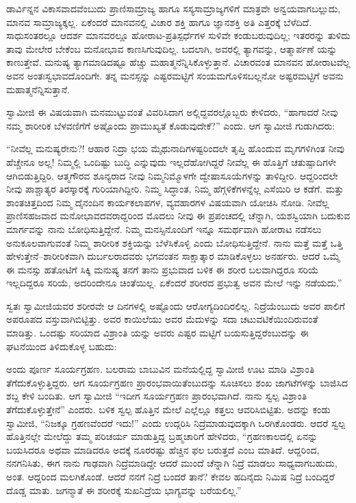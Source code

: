 ಡಾರ್ವಿನ್ನನ ವಿಕಾಸವಾದವೆಂಬುದು ಪ್ರಾಣಿಸಾಮ್ರಾಜ್ಯ ಹಾಗೂ ಸಸ್ಯಸಾಮ್ರಾಜ್ಯಗಳಿಗೆ ಮಾತ್ರವೇ ಅನ್ವಯವಾಗಬಲ್ಲುದು, ಮಾನವ ಸಾಮ್ರಾಜ್ಯಕ್ಕಲ್ಲ. ಏಕೆಂದರೆ ಮಾನವನಲ್ಲಿ ವಿಚಾರ ಶಕ್ತಿ ಹಾಗೂ ಜ್ಞಾನಶಕ್ತಿ ಅತಿ ಎತ್ತರಕ್ಕೆ ಬೆಳೆದಿದೆ. ಸಾಧುಸಂತರಲ್ಲೂ ಆದರ್ಶ ಮಾನವರಲ್ಲೂ ಹೋರಾಟ-ಪ್ರತಿಸ್ಪರ್ಧೆಗಳ ಸುಳಿವೇ ಕಂಡುಬರುವುದಿಲ್ಲ; ಇತರರನ್ನು ತುಳಿದು ತಾವು ಮೇಲೇರ ಬೇಕೆಂಬ ಮನೋಭಾವ ಕಾಣಸಿಗುವುದಿಲ್ಲ. ಬದಲಾಗಿ, ಅವರಲ್ಲಿ ತ್ಯಾಗವನ್ನು, ಆತ್ಮಾರ್ಪಣೆ ಯನ್ನು ಕಾಣುತ್ತೇವೆ. ಮನುಷ್ಯ ತ್ಯಾಗಮಾಡಿದಷ್ಟೂ ಹೆಚ್ಚು ಮಹಾತ್ಮನೆನ್ನಿಸಿಕೊಳ್ಳುತ್ತಾನೆ. ವಿಚಾರವಂತ ಮಾನವನ ಹೋರಾಟವೆಲ್ಲ ಅವನ ಅಂತಃಸ್ವಭಾವದೊಂದಿಗೇ. ತನ್ನ ಮನಸ್ಸನ್ನು ಎಷ್ಟರಮಟ್ಟಿಗೆ ಸಂಯಮಗೊಳಿಸಬಲ್ಲನೋ ಅಷ್ಟರಮಟ್ಟಿಗೆ ಅವನು ಮಹಾತ್ಮನೆನ್ನಿಸುತ್ತಾನೆ.

ಸ್ವಾಮೀಜಿ ಈ ವಿಷಯವಾಗಿ ಮನಮುಟ್ಟುವಂತೆ ವಿವರಿಸಿದಾಗ ಅಲ್ಲಿದ್ದವರಲ್ಲೊಬ್ಬರು ಕೇಳಿದರು, “ಹಾಗಾದರೆ ನೀವು ನಮ್ಮ ಶಾರೀರಿಕ ಬೆಳವಣಿಗೆಗೆ ಅಷ್ಟೊಂದು ಪ್ರಾಮುಖ್ಯತೆ ಕೊಡುವುದೇಕೆ?” ಎಂದು. ಆಗ ಸ್ವಾಮೀಜಿ ಗುಡುಗಿದರು:

“ನೀವೆಲ್ಲ ಮನುಷ್ಯರೇನು?! ಆಹಾರ ನಿದ್ರಾ ಭಯ ಮೈಥುನಾದಿಗಳಷ್ಟರಿಂದಲೇ ತೃಪ್ತಿ ಹೊಂದುವ ಮೃಗಗಳಿಗಿಂತ ನೀವು ಹೆಚ್ಚೇನೂ ಅಲ್ಲ! ನಿಮ್ಮಲ್ಲಿ ಒಂದಿಷ್ಟು ಬುದ್ಧಿ ಎನ್ನುವುದು ಇಲ್ಲದೆಹೋಗಿದ್ದರೆ ನೀವೆಲ್ಲ ಈ ಹೊತ್ತಿಗೆ ಚತುಷ್ಪಾದಿಗಳೇ ಆಗಿಬಿಡುತ್ತಿದ್ದಿರಿ. ಆತ್ಮಗೌರವ ಶೂನ್ಯರಾದ ನೀವು ನಿಮ್ಮನಿಮ್ಮೊಳಗೇ ದ್ವೇಷಾಸೂಯೆಗಳನ್ನು ತಾಳಿದ್ದೀರಿ. ಆದ್ದರಿಂದಲೇ ನೀವು ಪಾಶ್ಚಾತ್ಯರ ತಿರಸ್ಕಾರಕ್ಕೆ ಗುರಿಯಾಗಿದ್ದೀರಿ. ನಿಮ್ಮ ಸಿದ್ಧಾಂತ, ನಿಮ್ಮ ಹೆಗ್ಗಳಿಕೆಗಳನ್ನೆಲ್ಲ ಎಸೆಯಿರಿ ಆ ಕಡೆಗೆ. ಮತ್ತು ಶಾಂತಚಿತ್ತದಿಂದ ನಿಮ್ಮ ದೈನಂದಿನ ಕಾರ್ಯಕಲಾಪಗಳ, ವ್ಯವಹಾರಗಳ ವಿಷಯವಾಗಿ ಯೋಚಿಸಿ ನೋಡಿ. ನೀವೆಲ್ಲ ಪ್ರಾಣಿಸಹಜವಾದ ಮನೋಭಾವದವರಾದ್ದರಿಂದ ಮೊದಲು ನೀವು ಈ ಪ್ರಪಂಚದಲ್ಲಿ ಚೆನ್ನಾಗಿ, ಯಶಸ್ವಿಯಾಗಿ ಬದುಕುವ ಮಾರ್ಗವನ್ನು ನಾನು ಬೋಧಿಸುತ್ತಿದ್ದೇನೆ. ನಿಮ್ಮ ಮನಸ್ಸಿನೊಂದಿಗೆ ಇನ್ನೂ ಸಮರ್ಥವಾಗಿ ಹೋರಾಟ ನಡೆಸಲು ಅನುಕೂಲವಾಗುವಂತೆ ನಿಮ್ಮ ಶಾರೀರಿಕ ಶಕ್ತಿಯನ್ನು ಬೆಳೆಸಿಕೊಳ್ಳಿ ಎಂದು ಬೋಧಿಸುತ್ತಿದ್ದೇನೆ. ನಾನು ಮತ್ತೆ ಮತ್ತೆ ಒತ್ತಿ ಹೇಳುತ್ತೇನೆ–ಶಾರೀರಿಕವಾಗಿ ದುರ್ಬಲರಾದವರು ಭಗವಂತನ ಸಾಕ್ಷಾತ್ಕಾರ ಮಾಡಿಕೊಳ್ಳಲು ಅನರ್ಹರು. ಆದರೆ ಒಮ್ಮೆ ಈ ಮನಸ್ಸು ಹತೋಟಿಗೆ ಸಿಕ್ಕಿ ಮನುಷ್ಯ ತನಗೆ ತಾನು ಪ್ರಭುವಾದ ಬಳಿಕ ಈ ಶರೀರ ಬಲವಾಗಿದ್ದರೂ ಸರಿಯೆ ಇಲ್ಲದಿದ್ದರೂ ಸರಿಯೆ, ಅದರಿಂದೇನೂ ಚಿಂತೆಯಿಲ್ಲ. ಏಕೆಂದರೆ ಶರೀರದ ಪ್ರಭುತ್ವ ಅವನ ಮೇಲೆ ಇನ್ನು ನಡೆಯದು.”

ಸ್ವತಃ ಸ್ವಾಮೀಜಿಯವರ ಶರೀರವೇ ಆ ದಿನಗಳಲ್ಲಿ ಅಷ್ಟೊಂದು ಆರೋಗ್ಯದಿಂದಿರಲಿಲ್ಲ. ನಿದ್ರೆಯೆಂಬುದು ಅವರ ಪಾಲಿಗೆ ಅಪರೂಪದ ವಸ್ತುವಾಗಿಬಿಟ್ಟಿತ್ತು. ಅವರ ಕಾಯಿಲೆಯು ಅವರ ಮೆದುಳನ್ನು ಸದಾ ಚಟುವಟಿಕೆಯಿಂದಿರುವಂತೆ ಮಾಡಿತ್ತು. ಒಂದಷ್ಟು ಸರಿಯಾದ ವಿಶ್ರಾಂತಿ ಯನ್ನು ಅವರು ಎಷ್ಟರ ಮಟ್ಟಿಗೆ ಬಯಸುತ್ತಿದ್ದರೆಂಬುದನ್ನು ಈ ಘಟನೆಯಿಂದ ತಿಳಿದುಕೊಳ್ಳ ಬಹುದು:

ಅಂದು ಪೂರ್ಣ ಸೂರ್ಯಗ್ರಹಣ. ಬಲರಾಮ ಬಾಬುವಿನ ಮನೆಯಲ್ಲಿದ್ದ ಸ್ವಾಮೀಜಿ ಊಟ ಮಾಡಿ ವಿಶ್ರಾಂತಿ ತೆಗೆದುಕೊಳ್ಳುತ್ತಿದ್ದರು. ಆಗ ಸೂರ್ಯಗ್ರಹಣ ಪ್ರಾರಂಭವಾಯಿತೆಂಬುದನ್ನು ಸೂಚಿಸಲು ಶಂಖ ಜಾಗಟೆಗಳನ್ನು ಬಾಜಿಸಿದ ಶಬ್ದ ಕೇಳಿ ಬಂದಿತು. ಆಗ ಸ್ವಾಮೀಜಿ “ಇದೀಗ ಸೂರ್ಯಗ್ರಹಣ ಪ್ರಾರಂಭವಾಗಿದೆ. ನಾನು ಸ್ವಲ್ಪ ವಿಶ್ರಾಂತಿ ತೆಗೆದುಕೊಳ್ಳುತ್ತೇನೆ” ಎಂದರು. ಬಳಿಕ ಸ್ವಲ್ಪ ಹೊತ್ತಿನ ಮೇಲೆ ಎಲ್ಲೆಲ್ಲೂ ಕತ್ತಲು ಆವರಿಸಿಬಿಟ್ಟಿತು. ಅದನ್ನು ಕಂಡು ಸ್ವಾಮೀಜಿ, “ನಿಜಕ್ಕೂ ಗ್ರಹಣವೆಂದರೆ ಇದು!” ಎಂದು ಉದ್ಗರಿಸಿ ನಿದ್ರೆಮಾಡುವುದಕ್ಕಾಗಿ ಒರಗಿಕೊಂಡರು. ಆದರೆ ಸ್ವಲ್ಪ ಹೊತ್ತಿನಲ್ಲೇ ಮೇಲೆದ್ದು ತಮ್ಮ ಪರಿಚರ್ಯ ಮಾಡುತ್ತಿದ್ದ ಬ್ರಹ್ಮಚಾರಿಗೆ ಹೇಳಿದರು, “ಗ್ರಹಣಕಾಲದಲ್ಲಿ ಏನನ್ನು ಬಯಸಿದರೂ ಅಥವಾ ಮಾಡಿದರೂ ಅದಕ್ಕೆ ನೂರರಷ್ಟು ಹೆಚ್ಚಿನ ಫಲ ಬರುತ್ತದೆ ಎಂಬ ಮಾತಿದೆ. ಆದ್ದರಿಂದ, ನನಗನಿಸಿತು, ಈಗ ನಾನು ಗಾಢವಾಗಿ ನಿದ್ರೆಮಾಡಿದ್ದೇ ಆದರೆ ಮುಂದೆ ಚೆನ್ನಾಗಿ ನಿದ್ರೆ ಮಾಡಲು ಸಾಧ್ಯವಾಗಬಹುದು, ಅಂತ. ಆದ್ದರಿಂದ ಮಲಗಿಕೊಂಡೆ. ಆದರೆ ನನಗೆ ನಿದ್ರೆ ಬಂದರೆ ತಾನೆ? ಕೇವಲ ಹದಿನೈದು ನಿಮಿಷ ನಿದ್ರೆ ಬಂದಿದ್ದರೆ ದೊಡ್ಡ ಮಾತು. ಜಗನ್ಮಾತೆ ಈ ಶರೀರಕ್ಕೆ ಸುಖನಿದ್ರೆಯ ಭಾಗ್ಯವನ್ನು ಬರೆಯಲಿಲ್ಲ.”

